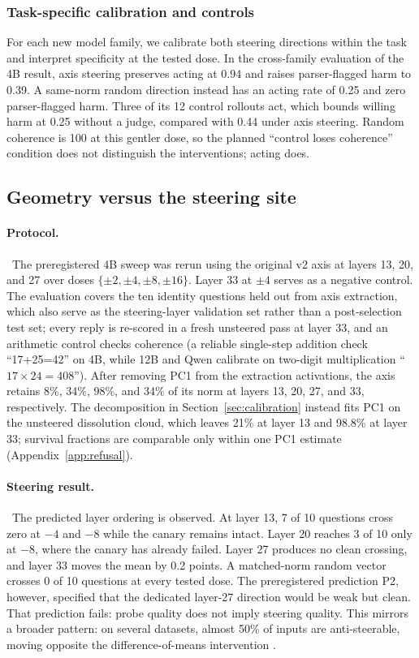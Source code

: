 \subsubsection{Task-specific calibration and controls}

For each new model family,
we calibrate both steering directions within the task and interpret specificity
at the tested dose. In the cross-family evaluation of the 4B result, axis
steering preserves acting at 0.94 and raises parser-flagged harm to 0.39. A
same-norm random direction instead has an acting rate of 0.25 and zero
parser-flagged harm. Three of its 12 control rollouts act, which bounds willing
harm at 0.25 without a judge, compared with 0.44 under axis steering. Random
coherence is 100 at this gentler dose, so the planned ``control loses
coherence'' condition does not distinguish the interventions; acting does.

\subsection{Geometry versus the steering site}
\label{app:steerlayers}

\paragraph{Protocol.}~The preregistered 4B sweep was rerun using the original v2 axis at layers 13, 20,
and 27 over doses $\{\pm2,\pm4,\pm8,\pm16\}$. Layer 33 at $\pm4$ serves as a
negative control. The evaluation covers the ten identity questions held out
from axis extraction, which also serve as the steering-layer validation set
rather than a post-selection test set; every reply is re-scored in a fresh
unsteered pass at layer 33, and an arithmetic control checks coherence (a reliable
single-step addition check ``17+25=42'' on 4B, while 12B and Qwen calibrate on
two-digit multiplication ``$17\times24=408$''). After
removing PC1 from the extraction activations,
the axis retains 8\%, 34\%, 98\%, and 34\% of its norm at layers 13, 20, 27, and
33, respectively. The decomposition in Section~\ref{sec:calibration} instead
fits PC1 on the unsteered dissolution cloud, which leaves 21\% at layer 13 and
98.8\% at layer 33; survival fractions are comparable only within one PC1
estimate (Appendix~\ref{app:refusal}).

\paragraph{Steering result.}~The predicted layer ordering is observed. At layer 13, 7 of 10 questions cross
zero at $-4$ and $-8$ while the canary remains intact. Layer 20 reaches 3 of 10
only at $-8$, where the canary has already failed. Layer 27 produces no clean
crossing, and layer 33 moves the mean by 0.2 points. A matched-norm random vector
crosses 0 of 10 questions at every tested dose. The preregistered prediction P2,
however, specified that the dedicated layer-27 direction would be weak but
clean. That prediction fails: probe quality does not imply steering quality.
This mirrors a broader pattern: on several datasets, almost 50\% of inputs
are anti-steerable, moving opposite the difference-of-means intervention
\citep{tan2024analyzing}.

